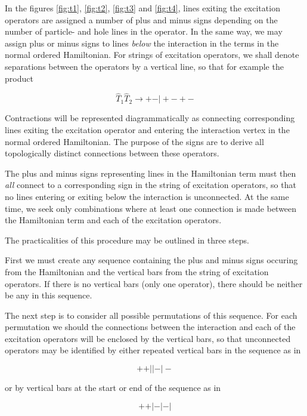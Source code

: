 In the figures \ref{fig:t1}, \ref{fig:t2}, \ref{fig:t3} and \ref{fig:t4}, lines exiting the excitation operators are assigned a number of plus and minus signs depending on the number of particle- and hole lines in the operator. In the same way, we may assign plus or minus signs to lines \emph{below} the interaction in the terms in the normal ordered Hamiltonian. For strings of excitation operators, we shall denote separations between the operators by a vertical line, so that for example the product 

\begin{equation}
\hat{T}_1 \hat{T}_2 \rightarrow + - \vert + - + - 
\label{eqn:exprod}
\end{equation}

Contractions will be represented diagrammatically as connecting corresponding lines exiting the excitation operator and entering the interaction vertex in the normal ordered Hamiltonian. The purpose of the signs are to derive all topologically distinct connections between these operators. 

The plus and minus signs representing lines in the Hamiltonian term must then \emph{all} connect to a corresponding sign in the string of excitation operators, so that no lines entering or exiting below the interaction is unconnected. At the same time, we seek only combinations where at least one connection is made between the Hamiltonian term and each of the excitation operators. 

The practicalities of this procedure may be outlined in three steps.

First we must create any sequence containing the plus and minus signs occuring from the Hamiltonian and the vertical bars from the string of excitation operators. If there is no vertical bars (only one operator), there should be neither be any in this sequence. 

The next step is to consider all possible permutations of this sequence. For each permutation we should the connections between the interaction and each of the excitation operators will be enclosed by the vertical bars, so that unconnected operators may be identified by either repeated vertical bars in the sequence as in 

\begin{equation}
+ + \vert \vert - \vert -
\end{equation}

or by vertical bars at the start or end of the sequence as in

\begin{equation}
+ + \vert -\vert - \vert
\end{equation}

